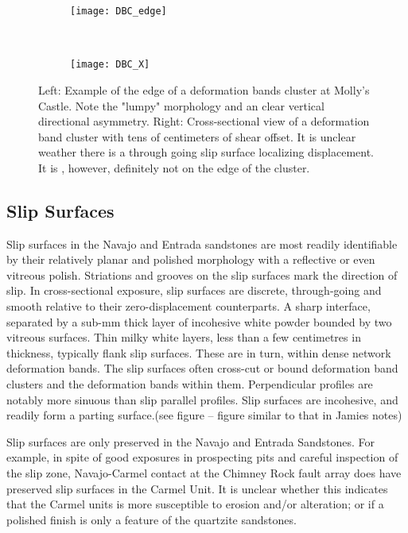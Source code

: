 \documentclass[12pt,a4paper]{article}
\begin{document}
 \begin{figure}[H]
	\centering
	\begin{subfigure}[b]{0.4\textwidth}
		\texttt{[image: DBC\_edge]}
	\end{subfigure}
	~
	\begin{subfigure}[b]{0.4\textwidth}
		\texttt{[image: DBC\_X]}
	\end{subfigure}
	\caption{Left: Example of the edge of a deformation bands cluster at Molly's Castle. Note the "lumpy" morphology and an clear vertical directional asymmetry. Right: Cross-sectional view of a deformation band cluster with tens of centimeters of shear offset. It is unclear weather there is a through going slip surface localizing displacement. It is , however, definitely not on the edge of the cluster.}
	\label{DBC}
\end{figure}		


\subsection{Slip Surfaces}

Slip surfaces in the Navajo and Entrada sandstones are most readily identifiable by their relatively planar and polished morphology with a reflective or even vitreous polish. Striations and grooves on the slip surfaces mark the direction of slip. In cross-sectional exposure, slip surfaces are discrete, through-going and smooth relative to their zero-displacement counterparts. A sharp interface, separated by a sub-mm thick layer of incohesive white powder bounded by two vitreous surfaces. Thin milky white layers, less than a few centimetres in thickness, typically flank slip surfaces. These are in turn, within dense network deformation bands. The slip surfaces often cross-cut or bound deformation band clusters and the deformation bands within them. Perpendicular profiles are notably more sinuous than slip parallel profiles. Slip surfaces are incohesive, and readily form a parting surface.(see figure – figure similar to that in Jamies notes)

Slip surfaces are only preserved in the Navajo and Entrada Sandstones. For example, in spite of good exposures in prospecting pits and careful inspection of the slip zone, Navajo-Carmel contact at the Chimney Rock fault array does have preserved slip surfaces in the Carmel Unit. It is unclear whether this indicates that the Carmel units is more susceptible to erosion and/or alteration; or if a polished finish is only a feature of the quartzite sandstones.
\end{document}
